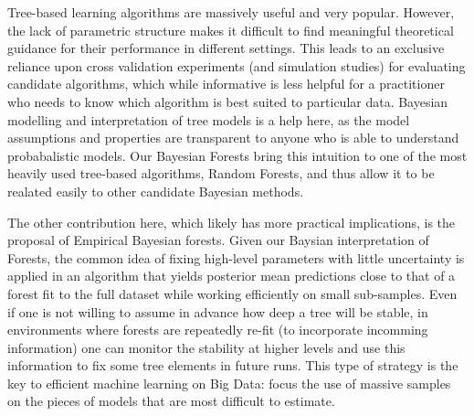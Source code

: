\documentclass[12pt]{article}
\begin{document}
Tree-based learning algorithms are massively useful and very popular.
However, the lack of parametric structure makes it difficult to find
meaningful theoretical guidance for their performance in different
settings. This leads to an exclusive reliance upon cross validation
experiments (and simulation studies) for evaluating candidate
algorithms, which while informative is less helpful for a practitioner
who needs to know which algorithm is best suited to particular data.
Bayesian modelling and interpretation of tree models is a help here, as
the model assumptions and properties are transparent to anyone who is
able to understand probabalistic models. Our Bayesian Forests bring this
intuition to one of the most heavily used tree-based algorithms, Random
Forests, and thus allow it to be realated easily to other candidate
Bayesian methods.

The other contribution here, which likely has more practical
implications, is the proposal of Empirical Bayesian forests. Given our
Baysian interpretation of Forests, the common idea of fixing high-level
parameters with little uncertainty is applied in an algorithm that
yields posterior mean predictions close to that of a forest fit to the
full dataset while working efficiently on small sub-samples. Even if one
is not willing to assume in advance how deep a tree will be stable, in
environments where forests are repeatedly re-fit (to incorporate
incomming information) one can monitor the stability at higher levels
and use this information to fix some tree elements in future runs. This
type of strategy is the key to efficient machine learning on Big Data:
focus the use of massive samples on the pieces of models that are most
difficult to estimate.

\small



    
    
\end{document}
